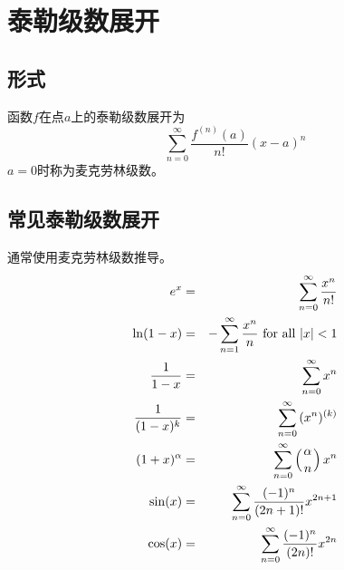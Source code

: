 \section{泰勒级数展开}
\subsection{形式}
函数$f$在点$a$上的泰勒级数展开为
\begin{displaymath}
    \sum_{n=0}^\infty{\frac{f^{(n)}(a)}{n!}(x-a)^n}
\end{displaymath}
$a=0$时称为麦克劳林级数。
\subsection{常见泰勒级数展开}
通常使用麦克劳林级数推导。
\begin{eqnarray*}
    e^x&=&\sum_{n=0}^\infty{\frac{x^n}{n!}}\\
    \ln(1-x)&=&-\sum_{n=1}^\infty{\frac{x^n}{n}} \textrm{~for all $|x|<1$}\\
    \frac{1}{1-x}&=&\sum_{n=0}^\infty{x^n}\\
    \frac{1}{(1-x)^k}&=&\sum_{n=0}^\infty{(x^n)^{(k)}}\\
    (1+x)^\alpha&=&\sum_{n=0}^\infty{\left(\alpha \atop n\right)x^n}\\
    \sin(x)&=&\sum_{n=0}^\infty{\frac{(-1)^n}{(2n+1)!}x^{2n+1}}\\
    \cos(x)&=&\sum_{n=0}^\infty{\frac{(-1)^n}{(2n)!}x^{2n}}\\
\end{eqnarray*}

